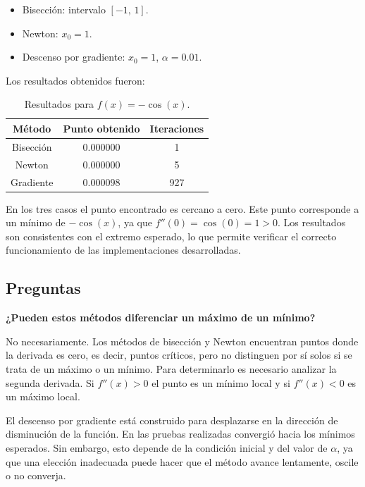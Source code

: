 \documentclass[12pt]{article}
\begin{document}
\begin{itemize}
\item Bisección: intervalo $[-1,\, 1]$.
\item Newton: $x_0 = 1$.
\item Descenso por gradiente: $x_0 = 1$, $\alpha = 0.01$.
\end{itemize}

Los resultados obtenidos fueron:

\begin{table}[h]
\centering
\begin{tabular}{ccc}
\hline
Método & Punto obtenido & Iteraciones \\
\hline
Bisección & $0.000000$ & 1   \\
Newton    & $0.000000$ & 5   \\
Gradiente & $0.000098$ & 927 \\
\hline
\end{tabular}
\caption{Resultados para $f(x)=-\cos(x)$.}
\end{table}

En los tres casos el punto encontrado es cercano a cero. Este punto corresponde a un mínimo de $-\cos(x)$, ya que $f''(0)=\cos(0)=1>0$. Los resultados son consistentes con el extremo esperado, lo que permite verificar el correcto funcionamiento de las implementaciones desarrolladas.


\subsection{Preguntas}

\textbf{¿Pueden estos métodos diferenciar un máximo de un mínimo?}

No necesariamente. Los métodos de bisección y Newton encuentran puntos donde la derivada es cero, es decir, puntos críticos, pero no distinguen por sí solos si se trata de un máximo o un mínimo. Para determinarlo es necesario analizar la segunda derivada. Si $f''(x) > 0$ el punto es un mínimo local y si $f''(x) < 0$ es un máximo local.

El descenso por gradiente está construido para desplazarse en la dirección de disminución de la función. En las pruebas realizadas convergió hacia los mínimos esperados. Sin embargo, esto depende de la condición inicial y del valor de $\alpha$, ya que una elección inadecuada puede hacer que el método avance lentamente, oscile o no converja.\\
\\
\\
\end{document}
